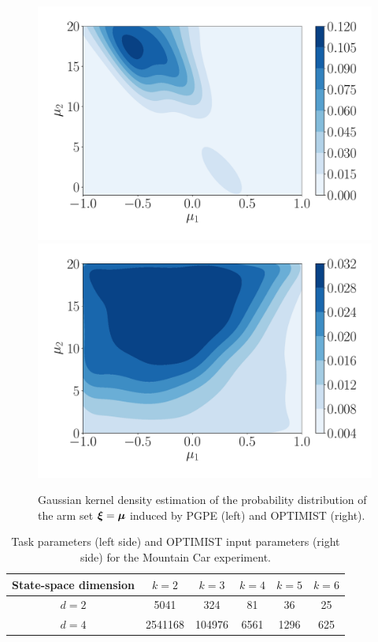 \begin{figure}[t!] 
\centering
\includegraphics[width=.5\textwidth]{Images/MCgainPGPE.pdf}\hfill
\includegraphics[width=.5\textwidth]{Images/MCgainOPTIMIST.pdf}
\caption{Gaussian kernel density estimation \cite{scott2015multivariate} of the probability distribution of the arm set $\boldsymbol{\xi}=\boldsymbol{\mu}$ induced by \gls{PGPE} (left) and \gls{OPTIMIST} (right).} 
\label{fig:MCgain}
\end{figure} 

\begin{table}[t!]
\centering
\begin{tabular}{c|ccccc} 
\toprule
State-space dimension & $k=2$ & $k=3$ & $k=4$ & $k=5$ & $k=6$\\
\midrule
$d=2$ & 5041 & 324 & 81 & 36 & 25\\
$d=4$ & 2541168 & 104976 & 6561 & 1296 & 625\\
\bottomrule
\end{tabular}
\caption{Task parameters (left side) and \gls{OPTIMIST} input parameters (right side) for the Mountain Car experiment.}
\label{tab:granularity}
\end{table}


